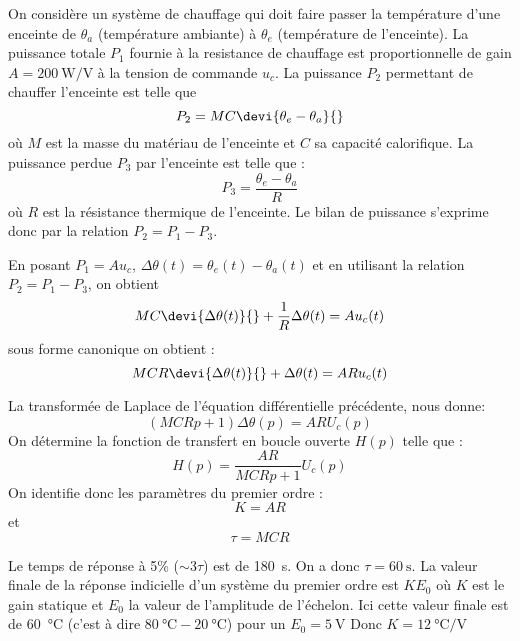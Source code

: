On considère un système de chauffage qui doit faire passer la température 
d'une enceinte de $\theta_a$  (température ambiante) à $\theta_e$ (température 
de l'enceinte). 
La puissance totale $P_1$ fournie à la resistance de chauffage 
est proportionnelle de gain $A=\SI{200}{\watt\per\volt}$ à la tension de 
commande $u_c$. La puissance $P_2$ permettant de chauffer l'enceinte est 
telle que 
\[
    P_2=MC\devi{\theta_e-\theta_a}{}
\]
où $M$ est la masse du matériau de l'enceinte et $C$ sa capacité calorifique.
La puissance perdue $P_3$ par l'enceinte est telle que :
\[
    P_3=\dfrac{\theta_e-\theta_a}{R}
\]
où $R$ est la résistance thermique de l'enceinte.
Le bilan de puissance s'exprime donc par la relation $P_2=P_1-P_3$.

\question{}
En posant $P_1=Au_c$, $\Delta\theta(t)=\theta_e(t)-\theta_a(t)$ et en utilisant
la relation $P_2=P_1-P_3$, on obtient 
\[
    MC\devi{\Delta\theta(t)}{}+\dfrac{1}{R}\Delta\theta(t)=Au_c(t)
\]
sous forme canonique on obtient :
\[
    MCR\devi{\Delta\theta(t)}{}+\Delta\theta(t)=ARu_c(t)
\]

\question{}
La transformée de Laplace de l'équation différentielle précédente, nous donne:
\[
    (MCRp+1)\Delta\theta(p)=AR U_c(p)
\]
On détermine la fonction de transfert en boucle ouverte $H(p)$ telle que :
\[
    H(p)=\dfrac{AR}{MCRp+1} U_c(p)
\]
On identifie donc les paramètres du premier ordre :
\[
    K=AR
\]
et
\[
    \tau=MCR
\]

\question{}

Le temps de réponse à 5\% ($\sim 3\tau$) est de \SI{180}{\second}. 
On a donc $\tau=\SI{60}{\second}$. 
La valeur finale de la réponse indicielle d'un système du premier ordre est 
$KE_0$ où $K$ est le gain statique et $E_0$ la valeur de l'amplitude de 
l'échelon. Ici cette valeur finale est de \SI{60}{\celsius} (c'est à dire 
$\SI{80}{\celsius} -\SI{20}{\celsius}$) pour un $E_0=\SI{5}{\volt}$
Donc $K=\SI{12}{\celsius\per\volt}$

